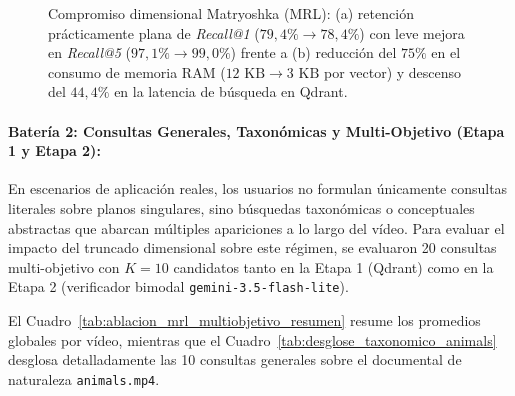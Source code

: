 \begin{figure}[htbp]
\caption{Compromiso dimensional Matryoshka (MRL): (a) retención prácticamente plana de \textit{Recall@1} ($79,4\% \to 78,4\%$) con leve mejora en \textit{Recall@5} ($97,1\% \to 99,0\%$) frente a (b) reducción del $75\%$ en el consumo de memoria RAM ($12\text{ KB} \to 3\text{ KB}$ por vector) y descenso del $44,4\%$ en la latencia de búsqueda en Qdrant.}
\label{fig:grafica_compromiso_mrl}
\end{figure}

\paragraph{Batería 2: Consultas Generales, Taxonómicas y Multi-Objetivo (Etapa 1 y Etapa 2):}
En escenarios de aplicación reales, los usuarios no formulan únicamente consultas literales sobre planos singulares, sino búsquedas taxonómicas o conceptuales abstractas que abarcan múltiples apariciones a lo largo del vídeo. Para evaluar el impacto del truncado dimensional sobre este régimen, se evaluaron 20 consultas multi-objetivo con $K=10$ candidatos tanto en la Etapa 1 (Qdrant) como en la Etapa 2 (verificador bimodal \texttt{gemini-3.5-flash-lite}).

El Cuadro~\ref{tab:ablacion_mrl_multiobjetivo_resumen} resume los promedios globales por vídeo, mientras que el Cuadro~\ref{tab:desglose_taxonomico_animals} desglosa detalladamente las 10 consultas generales sobre el documental de naturaleza \texttt{animals.mp4}.

